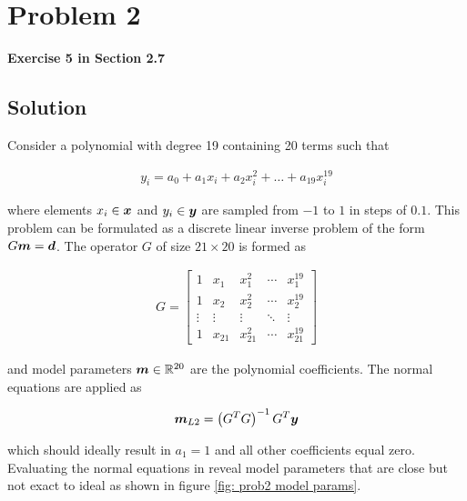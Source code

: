 
\begingroup
\allowdisplaybreaks

\newpage
\section{Problem 2}

\textbf{Exercise 5 in Section 2.7}

\subsection{Solution}

Consider a polynomial with degree 19 containing 20 terms such that

\begin{align*}
	y_i = a_0 + a_1 x_i + a_2 x_i^2 + \ldots + a_{19} x_i^{19}
\end{align*}

where elements $x_i \in \boldsymbol{x}$ and $y_i \in \boldsymbol{y}$ are sampled from $-1$ to $1$ in steps of $0.1$. This problem can be formulated as a discrete linear inverse problem of the form $G\boldsymbol{m} = \boldsymbol{d}$. The operator $G$ of size $21 \times 20$ is formed as

\begin{align*}
	G = \begin{bmatrix}
		1 & x_1 & x_1^2 & \cdots & x_1^{19} \\
		1 & x_2 & x_2^2 & \cdots & x_2^{19} \\
		\vdots & \vdots & \vdots & \ddots & \vdots \\
		1 & x_{21} & x_{21}^2 & \cdots & x_{21}^{19}
	\end{bmatrix}
\end{align*}

and model parameters $\boldsymbol{m} \in \mathbb{R}^{20}$ are the polynomial coefficients. The normal equations are applied as

\begin{align*}
	\boldsymbol{m}_{L2} = \left(G^T G\right)^{-1} G^T \boldsymbol{y}
\end{align*}

which should ideally result in $a_1 = 1$ and all other coefficients equal zero. Evaluating the normal equations in \MATLAB reveal model parameters that are close but not exact to ideal as shown in figure \ref{fig: prob2 model params}. 

